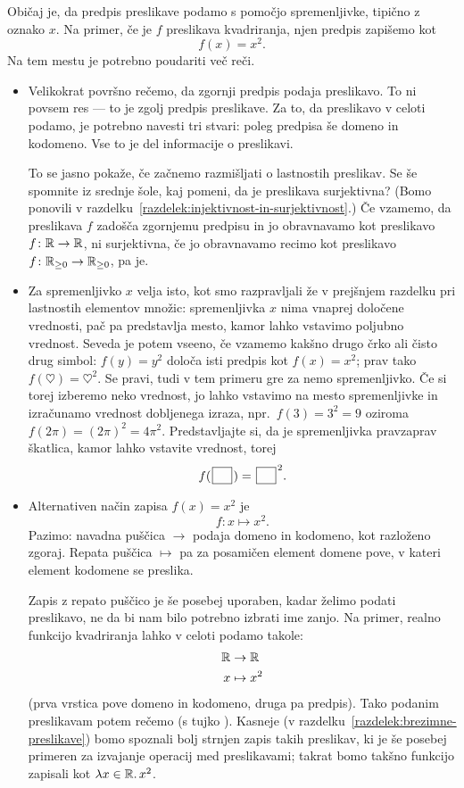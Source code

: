 Običaj je, da predpis preslikave podamo s pomočjo spremenljivke, tipično z oznako $x$. Na primer, če je $f$ preslikava kvadriranja, njen predpis zapišemo kot
\[f(x) = x^2.\]
Na tem mestu je potrebno poudariti več reči.
\begin{itemize}
\item
Velikokrat površno rečemo, da zgornji predpis podaja preslikavo. To ni povsem res --- to je zgolj predpis preslikave. Za to, da preslikavo v celoti podamo, je potrebno navesti tri stvari: poleg predpisa še domeno in kodomeno. Vse to je del informacije o preslikavi.


To se jasno pokaže, če začnemo razmišljati o lastnostih preslikav. Se še spomnite iz srednje šole, kaj pomeni, da je preslikava surjektivna? (Bomo ponovili v razdelku~\ref{razdelek:injektivnost-in-surjektivnost}.) Če vzamemo, da preslikava $f$ zadošča zgornjemu predpisu in jo obravnavamo kot preslikavo $f\colon \mathbb{R} \to \mathbb{R}$, ni surjektivna, če jo obravnavamo recimo kot preslikavo $f\colon \mathbb{R}_{\geq 0} \to \mathbb{R}_{\geq 0}$, pa je.
\item
Za spremenljivko $x$ velja isto, kot smo razpravljali že v prejšnjem razdelku pri lastnostih elementov množic: spremenljivka $x$ nima vnaprej določene vrednosti, pač pa predstavlja mesto, kamor lahko vstavimo poljubno vrednost. Seveda je potem vseeno, če vzamemo kakšno drugo črko ali čisto drug simbol: $f(y) = y^2$ določa isti predpis kot $f(x) = x^2$; prav tako $f(\heartsuit) = \heartsuit^2$. Se pravi, tudi v tem primeru gre za nemo spremenljivko. Če si torej izberemo neko vrednost, jo lahko vstavimo na mesto spremenljivke in izračunamo vrednost dobljenega izraza, npr.~$f(3) = 3^2 = 9$ oziroma $f(2\pi) = (2\pi)^2 = 4\pi^2$. Predstavljajte si, da je spremenljivka pravzaprav škatlica, kamor lahko vstavite vrednost, torej
\[f(\argbox) = \argbox^2.\]
\item
Alternativen način zapisa $f(x) = x^2$ je
\[f\colon x \mapsto x^2.\]
Pazimo: navadna puščica $\to$ podaja domeno in kodomeno, kot razloženo zgoraj. Repata puščica $\mapsto$ pa za posamičen element domene pove, v kateri element kodomene se preslika.

Zapis z repato puščico je še posebej uporaben, kadar želimo podati preslikavo, ne da bi nam bilo potrebno izbrati ime zanjo. Na primer, realno funkcijo kvadriranja lahko v celoti podamo takole:
\begin{align*}
\mathbb{R} &\to \mathbb{R} \\
x &\mapsto x^2
\end{align*}
(prva vrstica pove domeno in kodomeno, druga pa predpis). Tako podanim preslikavam potem rečemo  (s tujko ). Kasneje (v razdelku~\ref{razdelek:brezimne-preslikave}) bomo spoznali bolj strnjen zapis takih preslikav, ki je še posebej primeren za izvajanje operacij med preslikavami; takrat bomo takšno funkcijo zapisali kot $\lambda x \in \mathbb{R} .\, x^2$.
\end{itemize}

